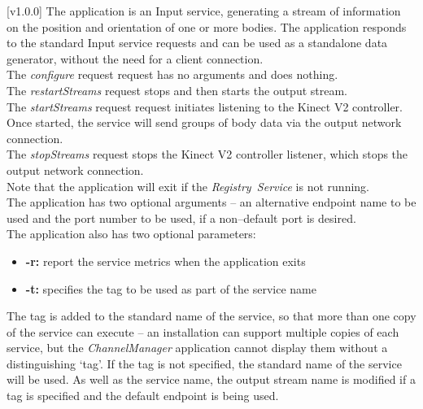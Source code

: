 [v1.0.0]
The  application is an Input service,
generating a stream of information on the position and orientation of one or more bodies.
The application responds to the standard Input service requests and can be used as a
standalone data generator, without the need for a client connection.\\

The \emph{configure} request request has no arguments and does nothing.\\

The \emph{restartStreams} request stops and then starts the output stream.\\

The \emph{startStreams} request request initiates listening to the Kinect V2 controller.
Once started, the service will send groups of body data via the output \yarp{} network
connection.\\

The \emph{stopStreams} request stops the Kinect V2 controller listener, which stops the
output \yarp{} network connection.\\ 

Note that the application will exit if the \emph{Registry~Service} is not running.\\

The application has two optional arguments -- an alternative endpoint name to be used and
the port number to be used, if a non--default port is desired.\\

The application also has two optional parameters:
\begin{itemize}
\item \textbf{-r:} report the service metrics when the application exits
\item \textbf{-t:} specifies the tag to be used as part of the service name
\end{itemize}
The tag is added to the standard name of the service, so that more than one copy of the
service can execute -- an \mplusm{} installation can support multiple copies of each
 service, but the \emph{ChannelManager} application cannot display them
without a distinguishing `tag'.
If the tag is not specified, the standard name of the service will be used.
As well as the service name, the output stream name is modified if a tag is specified and
the default endpoint is being used.\\

